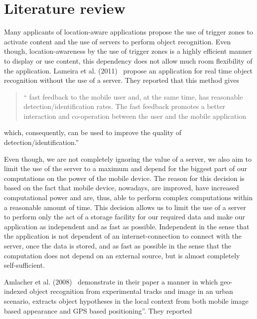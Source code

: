 \documentclass[12pt ,twocolumn]{article}
\begin{document}
\section{Literature review}\label{literature review}
Many applicants of location-aware applications propose the use of trigger zones to activate content and the use of servers to perform object recognition. Even though, location-awareness by the use of trigger zones is a highly efficient manner to display or use content, this dependency does not allow much room flexibility of the application.
Lameira et al. (2011)~\cite{Lameira:2011:ROR:2037373.2037485} propose an application for real time object recognition without the use of a server. They reported that this method gives 
\begin{quotation}
“ fast feedback to the mobile user and, at the same time, has reasonable detection/identification rates. The fast feedback promotes a better interaction and co-operation between the user and the mobile application \end{quotation}
which, consequently, can be used to improve the quality of detection/identification.” 

Even though, we are not completely ignoring the value of a server, we also aim to limit the use of the server to a maximum and depend for the biggest part of our computations on the power of the mobile device. The reason for this decision is based on the fact that mobile device, nowadays, are improved, have increased computational power and are, thus, able to perform complex computations within a reasonable amount of time. This decision allows us to limit the use of a server to perform only the act of a storage facility for our required data and make our application as independent and as fast as possible. Independent in the sense that the application is not dependent of an internet-connection to connect with the server, once the data is stored, and as fast as possible in the sense that the computation does not depend on an external source, but is almost completely self-sufficient.

Amlacher et al. (2008)~\cite{Amlacher:2008:GOR:1409240.1409291} demonstrate in their paper a manner in which geo-indexed object recognition from experimental tracks and image in an urban scenario, extracts object hypotheses in the local context from both mobile image based appearance and GPS based positioning”. They reported 
\end{document}
